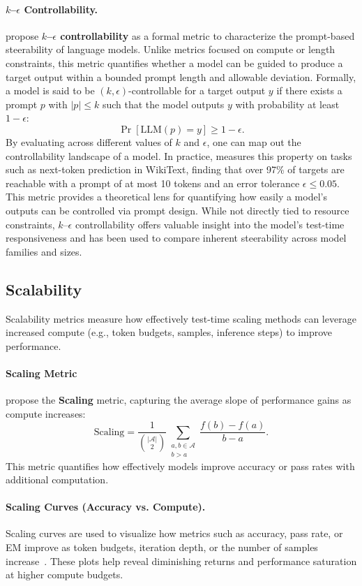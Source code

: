 \paragraph{\boldmath$k$--$\epsilon$ Controllability.} 
\citet{bhargava2024whatsmagicwordcontrol} propose \textbf{$k$--$\epsilon$ controllability} as a formal metric to characterize the prompt-based steerability of language models. Unlike metrics focused on compute or length constraints, this metric quantifies whether a model can be guided to produce a target output within a bounded prompt length and allowable deviation. Formally, a model is said to be $(k, \epsilon)$-controllable for a target output $y$ if there exists a prompt $p$ with $|p| \leq k$ such that the model outputs $y$ with probability at least $1 - \epsilon$:
\[
\Pr[\text{LLM}(p) = y] \geq 1 - \epsilon.
\]
By evaluating across different values of $k$ and $\epsilon$, one can map out the controllability landscape of a model. In practice, \citet{bhargava2024whatsmagicwordcontrol} measures this property on tasks such as next-token prediction in WikiText, finding that over 97\% of targets are reachable with a prompt of at most 10 tokens and an error tolerance $\epsilon \leq 0.05$. This metric provides a theoretical lens for quantifying how easily a model's outputs can be controlled via prompt design. While not directly tied to resource constraints, $k$--$\epsilon$ controllability offers valuable insight into the model's test-time responsiveness and has been used to compare inherent steerability across model families and sizes.

\subsection{Scalability}
\label{subsec:scalability}
Scalability metrics measure how effectively test-time scaling methods can leverage increased compute (e.g., token budgets, samples, inference steps) to improve performance.


\paragraph{Scaling Metric}
\citet{muennighoff2025s1} propose the \textbf{Scaling} metric, capturing the average slope of performance gains as compute increases:
\[
\text{Scaling} = \frac{1}{\binom{|\mathcal{A}|}{2}} \sum_{\substack{a, b \in \mathcal{A} \\ b > a}} \frac{f(b) - f(a)}{b - a}.
\]
This metric quantifies how effectively models improve accuracy or pass rates with additional computation.

\paragraph{Scaling Curves (Accuracy vs. Compute).}
Scaling curves are used to visualize how metrics such as accuracy, pass rate, or EM improve as token budgets, iteration depth, or the number of samples increase~\citep{aggarwal2025l1, teng2025atom, wu2024inference}. These plots help reveal diminishing returns and performance saturation at higher compute budgets.



